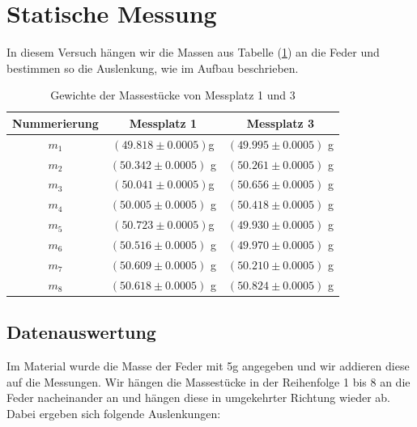 \documentclass[bibliography=totocnumbered]{scrartcl}
\begin{document}
	\section{Statische Messung}
	In diesem Versuch hängen wir die Massen aus Tabelle (\ref{tab: Massestücke}) an die Feder und bestimmen so die Auslenkung, wie im Aufbau beschrieben.
	\begin{table}[ht!]
		\centering
		\caption{Gewichte der Massestücke von Messplatz 1 und 3}
		\begin{tabular}{|c|c|c|}
			\hline
		Nummerierung	& Messplatz 1 & Messplatz 3 \\
			\hline
			$ m_{1} $& $ (49.818\pm 0.0005) $g & $ (49.995  \pm0.0005) $ g\\
			\hline
			$ m_{2} $& $ (50.342\pm0.0005) $ g& $ ( 50.261 \pm0.0005) $ g\\
			\hline
			$ m_{3} $& $ (50.041\pm0.0005) $g & $ (50.656  \pm0.0005) $ g\\
			\hline
			$ m_{4} $& $ (50.005\pm0.0005) $ g& $ (50.418  \pm0.0005) $ g\\
			\hline
			$ m_{5} $& $(50.723\pm0.0005)  $g & $ (49.930  \pm0.0005) $ g\\
			\hline
			$ m_{6} $& $ (50.516\pm0.0005) $ g& $ (49.970  \pm0.0005) $ g\\
			\hline
			$ m_{7} $& $ (50.609\pm0.0005) $ g& $ ( 50.210 \pm0.0005) $ g\\
			\hline
			$ m_{8} $& $ (50.618\pm0.0005) $ g& $ ( 50.824 \pm0.0005) $ g\\
			\hline
		\end{tabular}
	\label{tab: Massestücke}
	\end{table} 
	\subsection{Datenauswertung}
	Im Material wurde die Masse der Feder mit 5g angegeben und wir addieren diese auf die Messungen. Wir hängen die Massestücke in der Reihenfolge 1 bis 8 an die Feder nacheinander an und hängen diese in umgekehrter Richtung wieder ab.\\
	Dabei ergeben sich folgende Auslenkungen:
	
\end{document}
